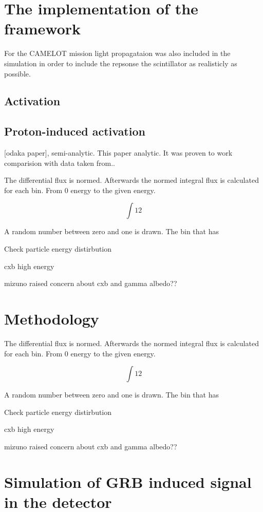 \documentclass[12pt]{spieman}  %
\begin{document}
\begin{spacing}{2}
\section{The implementation of the framework} 
 
For the CAMELOT mission light propagataion was also included in the simulation in order to include the repsonse the scintillator as realisticly as possible. 
 
\subsection{Activation} 

\subsection{Proton-induced activation} 



[odaka paper], semi-analytic. This paper analytic. It was proven to work comparision with data taken from..
 
 
\newpage 
 
The differential flux is normed. Afterwards the normed integral flux is calculated for each bin. From 0 energy to the given energy.

$$ \int{1}{2} $$
 
A random number between zero and one is drawn. The bin that has

Check particle energy distirbution

cxb high energy

mizuno raised concern about cxb and gamma albedo??
 
\section{Methodology} 
 
The differential flux is normed. Afterwards the normed integral flux is calculated for each bin. From 0 energy to the given energy.

$$ \int{1}{2} $$
 
A random number between zero and one is drawn. The bin that has

Check particle energy distirbution

cxb high energy

mizuno raised concern about cxb and gamma albedo??
 
\section{Simulation of GRB induced signal in the detector} 


\end{spacing}
\end{document}
